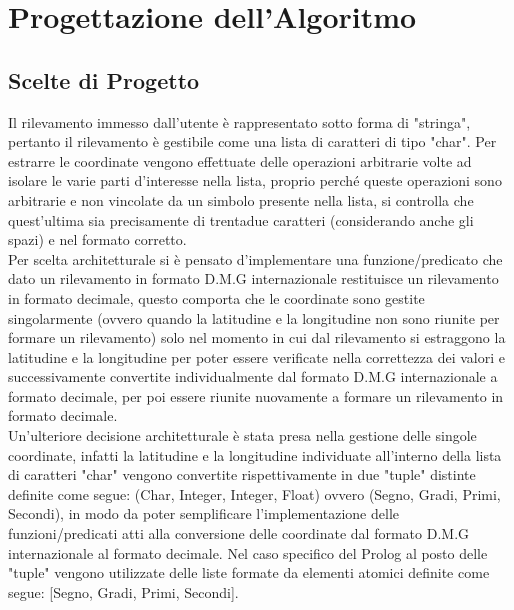 \documentclass{article}
\begin{document}
\section{Progettazione dell'Algoritmo}
\subsection{Scelte di Progetto}
Il rilevamento immesso dall'utente è rappresentato sotto forma di "stringa", pertanto il rilevamento è gestibile come una lista di caratteri di tipo "char". Per estrarre le coordinate vengono effettuate delle operazioni arbitrarie volte ad isolare le varie parti d'interesse nella lista, proprio perché queste operazioni sono arbitrarie e non vincolate da un simbolo presente nella lista, si controlla che quest'ultima sia precisamente di trentadue caratteri (considerando anche gli spazi) e nel formato corretto.\\
Per scelta architetturale si è pensato d'implementare una funzione/predicato che dato un rilevamento in formato D.M.G internazionale restituisce un rilevamento in formato decimale, questo comporta che le coordinate sono gestite singolarmente (ovvero quando la latitudine e la longitudine non sono riunite per formare un rilevamento) solo nel momento in cui dal rilevamento si estraggono la latitudine e la longitudine per poter essere verificate nella correttezza dei valori e successivamente convertite individualmente dal formato D.M.G internazionale a formato decimale, per poi essere riunite nuovamente a formare un rilevamento in formato decimale.\\
 Un'ulteriore decisione architetturale è stata presa nella gestione delle singole coordinate, infatti la latitudine e la longitudine individuate all'interno della lista di caratteri "char" vengono convertite rispettivamente in due "tuple" distinte definite come segue: (Char, Integer, Integer, Float) ovvero (Segno, Gradi, Primi, Secondi), in modo da poter semplificare l'implementazione delle funzioni/predicati atti alla conversione delle coordinate dal formato D.M.G internazionale al formato decimale. Nel caso specifico del Prolog al posto delle "tuple" vengono utilizzate delle liste formate da elementi atomici definite come segue:  [Segno, Gradi, Primi, Secondi].
 
\end{document}
